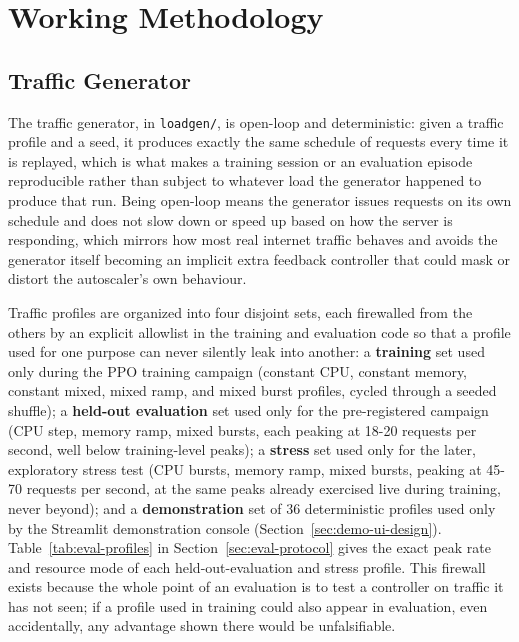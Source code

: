 \section{Working Methodology}
\label{sec:working-methodology}

\subsection{Traffic Generator}

The traffic generator, in \texttt{loadgen/\allowbreak \allowbreak }, is open-loop and
deterministic: given a traffic profile and a seed, it produces exactly the
same schedule of requests every time it is replayed, which is what makes a
training session or an evaluation episode reproducible rather than subject
to whatever load the generator happened to produce that run. Being
open-loop means the generator issues requests on its own schedule and does
not slow down or speed up based on how the server is responding, which
mirrors how most real internet traffic behaves and avoids the generator
itself becoming an implicit extra feedback controller that could mask or
distort the autoscaler's own behaviour.

Traffic profiles are organized into four disjoint sets, each firewalled
from the others by an explicit allowlist in the training and evaluation
code so that a profile used for one purpose can never silently leak into
another: a \textbf{training} set used only during the PPO training campaign
(constant CPU, constant memory, constant mixed, mixed ramp, and mixed burst
profiles, cycled through a seeded shuffle); a \textbf{held-out evaluation}
set used only for the pre-registered campaign (CPU step, memory ramp, mixed
bursts, each peaking at 18-20 requests per second, well below training-level
peaks); a \textbf{stress} set used only for the later, exploratory stress
test (CPU bursts, memory ramp, mixed bursts, peaking at 45-70 requests per
second, at the same peaks already exercised live during training, never
beyond); and a \textbf{demonstration} set of 36 deterministic profiles
used only by the Streamlit demonstration console
(Section~\ref{sec:demo-ui-design}). Table~\ref{tab:eval-profiles} in
Section~\ref{sec:eval-protocol} gives the exact peak rate and resource mode
of each held-out-evaluation and stress profile. This firewall exists
because the whole point of an evaluation is to test a controller on traffic
it has not seen; if a profile used in training could also appear in
evaluation, even accidentally, any advantage shown there would be
unfalsifiable.

